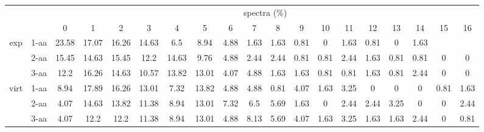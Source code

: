 \documentclass{article}[12pt]
\begin{document}
\begin{landscape}
\begin{table}[h]\tiny
\vspace{3mm}
{\centering
\begin{center}
\begin{tabular}{|c|l|c|c|c|c|c|c|c|c|c|c|c|c|c|c|c|c|c|}
  \hline
  \multicolumn{2}{|c|}{ } & \multicolumn{ 17 }{|c|}{ spectra (\%)} \\
  \cline{3- 19}
  \multicolumn{2}{|c|}{ }  & 0 & 1 & 2 & 3 & 4 & 5 & 6 & 7 & 8 & 9 & 10 & 11 & 12 & 13 & 14 & 15 & 16\\
  \hline
  \multirow{3}{*}{exp}
&  1-aa  & 23.58 & 17.07 & 16.26 & 14.63 & 6.5 & 8.94 & 4.88 & 1.63 & 1.63 & 0.81 & 0 & 1.63 & 0.81 & 0 & 1.63 &  & \\
&  2-aa  & 15.45 & 14.63 & 15.45 & 12.2 & 14.63 & 9.76 & 4.88 & 2.44 & 2.44 & 0.81 & 0.81 & 2.44 & 1.63 & 0.81 & 0.81 & 0 & 0\\
&  3-aa  & 12.2 & 16.26 & 14.63 & 10.57 & 13.82 & 13.01 & 4.07 & 4.88 & 1.63 & 1.63 & 0.81 & 0.81 & 1.63 & 0.81 & 2.44 & 0 & 0\\
 \hline
  \multirow{3}{*}{virt} 
&  1-aa  & 8.94 & 17.89 & 16.26 & 13.01 & 7.32 & 13.82 & 4.88 & 4.88 & 0.81 & 4.07 & 1.63 & 3.25 & 0 & 0 & 0 & 0.81 & 1.63\\
&  2-aa  & 4.07 & 14.63 & 13.82 & 11.38 & 8.94 & 13.01 & 7.32 & 6.5 & 5.69 & 1.63 & 0 & 2.44 & 2.44 & 3.25 & 0 & 0 & 2.44\\
&  3-aa  & 4.07 & 12.2 & 12.2 & 11.38 & 8.94 & 13.01 & 4.88 & 8.13 & 5.69 & 4.07 & 1.63 & 3.25 & 1.63 & 1.63 & 2.44 & 0 & 0.81\\
 \hline
\end{tabular}
\end{center}
\par}
\centering
\vspace{3mm}
\end{table}


\end{landscape}
\end{document}
